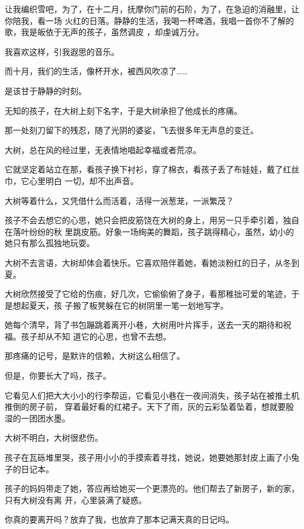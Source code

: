 \documentclass[12pt,a4paper]{article}
\def\blankrev{\vspace{1ex}}									%
\begin{document}
		让我编织雪吧，为了，在十二月，抚摩你门前的石阶，为了，在急迫的消融里，让你陪我，看一场
	火红的日落。静静的生活，我喝一杯啤酒，我唱一首你不了解的歌，我是皈依于无声的孩子，虽然调皮
	，却虔诚万分。


		\blankrev
		我喜欢这样，引我遐思的音乐。

		而十月，我们的生活，像杯开水，被西风吹凉了……

		是该甘于静静的时刻。

	\endwriting



		无知的孩子，在大树上刻下名字，于是大树承担了他成长的疼痛。

		那一处刻刀留下的残忍，随了光阴的婆娑，飞去很多年无声息的变迁。

		大树，总在风的经过里，无表情地唱起幸福或者荒凉。

		它就坚定着站立在那，看孩子换下衬衫，穿了棉衣，看孩子丢了布娃娃，戴了红丝巾，它心里明白
	一切，却不出声音。

		大树等着什么，又凭借什么而活着，活得一派葱茏，一派繁茂？

		孩子不会去想它的心思，她只会把皮筋饶在大树的身上，用另一只手牵引着，独自在落叶纷纷的秋
	里跳皮筋。好象一场绚美的舞蹈，孩子跳得精心，虽然，幼小的她只有那么孤独地玩耍。

		大树不去言语，大树却体会着快乐。它喜欢陪伴着她，看她淡粉红的日子，从冬到夏。

		大树欣然接受了它给的伤痕，好几次，它偷偷俯了身子，看那稚拙可爱的笔迹，于是想起夏天，孩
	子搬了板凳躲在它的树阴里一笔一划地写字。

		她每个清早，背了书包蹦跳着离开小巷，大树用叶片挥手，送去一天的期待和祝福。孩子却从不知
	道它的心思，也曾不去想。

		那疼痛的记号，是默许的信赖，大树这么相信了。

		但是，你要长大了吗，孩子。

		它看见人们把大大小小的行李帮运，它看见小巷在一夜间消失，孩子站在被推土机推倒的房子前，
	穿着最好看的红裙子。天下了雨，灰的云彩坠着坠着，想就要殷湿的一团团水墨。


		大树不明白，大树很悲伤。

		孩子在瓦砾堆里哭，孩子用小小的手摸索着寻找，她说，她要她那封皮上画了小兔子的日记本。

		孩子的妈妈带走了她，答应再给她买一个更漂亮的。他们帮去了新房子，新的家，只有大树没有离
	开，心里装满了疑惑。

		你真的要离开吗？放弃了我，也放弃了那本记满天真的日记吗。
\end{document}
